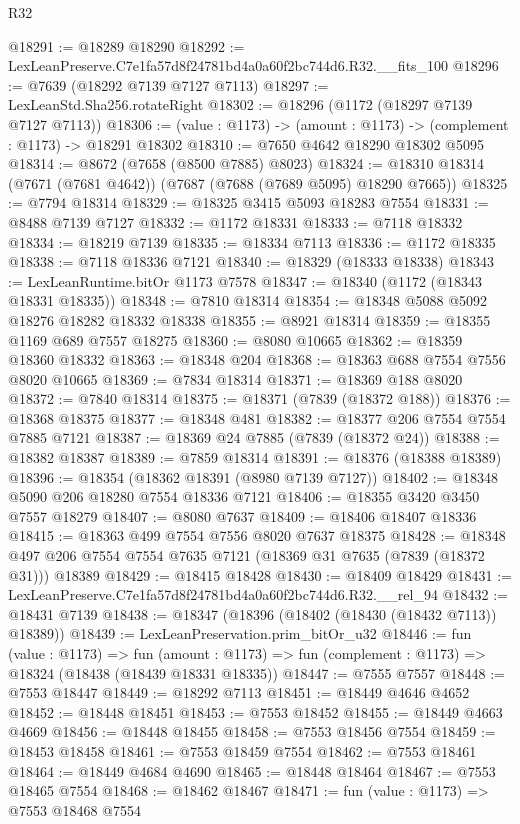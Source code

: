 \begin{lexlean}{R32}
\begin{coremodule}
@18291 := @18289 @18290
@18292 := LexLeanPreserve.C7e1fa57d8f24781bd4a0a60f2bc744d6.R32.__fits_100
@18296 := @7639 (@18292 @7139 @7127 @7113)
@18297 := LexLeanStd.Sha256.rotateRight
@18302 := @18296 (@1172 (@18297 @7139 @7127 @7113))
@18306 := (value : @1173) -> (amount : @1173) -> (complement : @1173) -> @18291 @18302
@18310 := @7650 @4642 @18290 @18302 @5095
@18314 := @8672 (@7658 (@8500 @7885) @8023)
@18324 := @18310 @18314 (@7671 (@7681 @4642)) (@7687 (@7688 (@7689 @5095) @18290 @7665))
@18325 := @7794 @18314
@18329 := @18325 @3415 @5093 @18283 @7554
@18331 := @8488 @7139 @7127
@18332 := @1172 @18331
@18333 := @7118 @18332
@18334 := @18219 @7139
@18335 := @18334 @7113
@18336 := @1172 @18335
@18338 := @7118 @18336 @7121
@18340 := @18329 (@18333 @18338)
@18343 := LexLeanRuntime.bitOr @1173 @7578
@18347 := @18340 (@1172 (@18343 @18331 @18335))
@18348 := @7810 @18314
@18354 := @18348 @5088 @5092 @18276 @18282 @18332 @18338
@18355 := @8921 @18314
@18359 := @18355 @1169 @689 @7557 @18275
@18360 := @8080 @10665
@18362 := @18359 @18360 @18332
@18363 := @18348 @204
@18368 := @18363 @688 @7554 @7556 @8020 @10665
@18369 := @7834 @18314
@18371 := @18369 @188 @8020
@18372 := @7840 @18314
@18375 := @18371 (@7839 (@18372 @188))
@18376 := @18368 @18375
@18377 := @18348 @481
@18382 := @18377 @206 @7554 @7554 @7885 @7121
@18387 := @18369 @24 @7885 (@7839 (@18372 @24))
@18388 := @18382 @18387
@18389 := @7859 @18314
@18391 := @18376 (@18388 @18389)
@18396 := @18354 (@18362 @18391 (@8980 @7139 @7127))
@18402 := @18348 @5090 @206 @18280 @7554 @18336 @7121
@18406 := @18355 @3420 @3450 @7557 @18279
@18407 := @8080 @7637
@18409 := @18406 @18407 @18336
@18415 := @18363 @499 @7554 @7556 @8020 @7637 @18375
@18428 := @18348 @497 @206 @7554 @7554 @7635 @7121 (@18369 @31 @7635 (@7839 (@18372 @31))) @18389
@18429 := @18415 @18428
@18430 := @18409 @18429
@18431 := LexLeanPreserve.C7e1fa57d8f24781bd4a0a60f2bc744d6.R32.__rel_94
@18432 := @18431 @7139
@18438 := @18347 (@18396 (@18402 (@18430 (@18432 @7113)) @18389))
@18439 := LexLeanPreservation.prim_bitOr_u32
@18446 := fun (value : @1173) =>
  fun (amount : @1173) => fun (complement : @1173) => @18324 (@18438 (@18439 @18331 @18335))
@18447 := @7555 @7557
@18448 := @7553 @18447
@18449 := @18292 @7113
@18451 := @18449 @4646 @4652
@18452 := @18448 @18451
@18453 := @7553 @18452
@18455 := @18449 @4663 @4669
@18456 := @18448 @18455
@18458 := @7553 @18456 @7554
@18459 := @18453 @18458
@18461 := @7553 @18459 @7554
@18462 := @7553 @18461
@18464 := @18449 @4684 @4690
@18465 := @18448 @18464
@18467 := @7553 @18465 @7554
@18468 := @18462 @18467
@18471 := fun (value : @1173) => @7553 @18468 @7554

\end{coremodule}
\end{lexlean}
